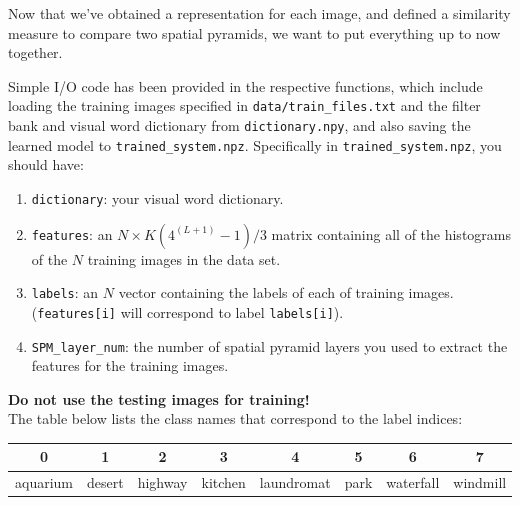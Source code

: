 \documentclass[11pt]{article}
\numberwithin{equation}{section} %
\numberwithin{figure}{section} %
\numberwithin{table}{section} %
\begin{document}
Now that we've obtained a representation for each image, and defined a similarity measure to compare two spatial pyramids, we want to put everything up to now together.

Simple I/O code has been provided in the respective functions, which include loading the training images specified in {\tt data/train\_files.txt} and the filter bank and visual word dictionary from {\tt dictionary.npy}, and also saving the learned model to {\tt trained\_system.npz}. Specifically in {\tt trained\_system.npz}, you should have:
\begin{enumerate}
\setlength{\parskip}{0pt}
\item {\tt dictionary}: your visual word dictionary.
\item {\tt features}: an $N \times  K\left(4^{(L+1)}-1\right)/3$ matrix containing all of
the histograms of the $N$ training images in the data set.
\item {\tt labels}: an $N$ vector containing the labels
of each of training images. ({\tt features[i]} will correspond to label {\tt labels[i]}).
\item {\tt SPM\_layer\_num}: the number of spatial pyramid layers you used to extract the features for the training images.
\end{enumerate}

{\bf Do not use the testing images for training!}\\

The table below lists the class names that correspond to the label indices:
\begin{center}
\begin{tabular}{c@{~~}c@{~~}c@{~~}c@{~~}c@{~~}c@{~~}c@{~~}c} \toprule
0 & 1 & 2 & 3 & 4 & 5 & 6 & 7 \\ \midrule
aquarium & desert & highway & kitchen & laundromat & park & waterfall & windmill\\ \bottomrule
\end{tabular} \\
\end{center}
\end{document}
